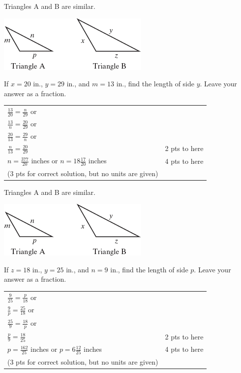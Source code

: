 {
	Triangles A and B are similar.\begin{center}\includegraphics{fig100-09.png}\end{center} If $x=20$ in., $y=29$ in., and $m=13$ in., find the length of side $y$. Leave your answer as a fraction.
}
{
	\begin{tabular}{l r}
	$\frac{13}{20}=\frac{n}{29}$ or &  \\
	$\frac{13}{n}=\frac{20}{29}$ or& \\
	$\frac{20}{13}=\frac{29}{n}$ or &\\
	$\frac{n}{13}=\frac{20}{29}$ & 2 pts to here\\
	$n=\frac{377}{20}$ inches or $n= 18 \frac{17}{20}$ inches & 4 pts to here \\
	(3 pts for correct solution, but no units are given)
	\end{tabular}
}

{
	Triangles A and B are similar.\begin{center}\includegraphics{fig100-09.png}\end{center} If $z=18$ in., $y=25$ in., and $n=9$ in., find the length of side $p$. Leave your answer as a fraction.
}
{
	\begin{tabular}{l r}
	$\frac{9}{25}=\frac{p}{18}$ or &  \\
	$\frac{9}{p}=\frac{25}{18}$ or& \\
	$\frac{25}{9}=\frac{18}{p}$ or &\\
	$\frac{p}{9}=\frac{18}{25}$ & 2 pts to here\\
	$p=\frac{162}{25}$ inches or $p= 6 \frac{12}{25}$ inches & 4 pts to here \\
	(3 pts for correct solution, but no units are given)
	\end{tabular}
}
